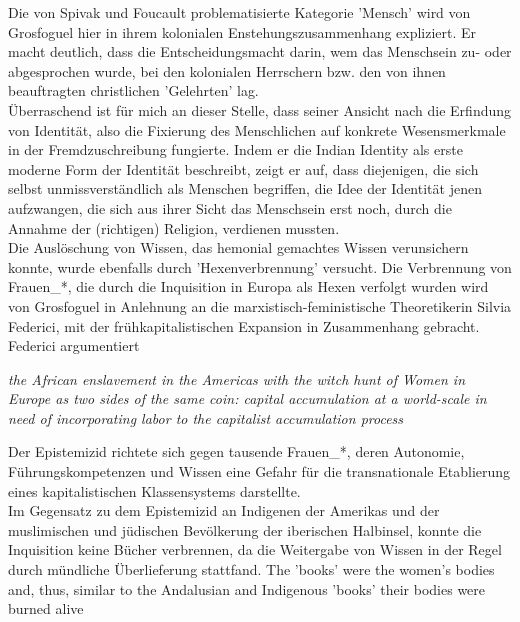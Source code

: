 \noindent Die von Spivak und Foucault
problematisierte Kategorie 'Mensch' wird von Grosfoguel hier in ihrem
kolonialen Enstehungszusammenhang expliziert. Er macht deutlich, dass die
Entscheidungsmacht darin, wem das Menschsein zu- oder abgesprochen wurde, bei
den kolonialen Herrschern bzw. den von ihnen beauftragten christlichen
'Gelehrten' lag. \\
Überraschend ist für mich an dieser Stelle, dass seiner
Ansicht nach die Erfindung von Identität, also die Fixierung des Menschlichen
auf konkrete Wesensmerkmale in der Fremdzuschreibung fungierte. Indem er die
\glqq Indian Identity \grqq als erste moderne Form der Identität beschreibt, zeigt er
auf, dass diejenigen, die sich selbst unmissverständlich als Menschen
begriffen, die Idee der Identität jenen aufzwangen, die sich aus ihrer Sicht
das Menschsein erst noch, durch die Annahme der (richtigen) Religion, verdienen
mussten.\\

\noindent Die Auslöschung von Wissen, das hemonial gemachtes Wissen verunsichern konnte,
wurde ebenfalls durch 'Hexenverbrennung'  versucht. Die Verbrennung von
Frauen\_*, die durch die Inquisition in Europa als Hexen verfolgt wurden wird
von Grosfoguel in Anlehnung an die marxistisch-feministische Theoretikerin
Silvia Federici, mit der frühkapitalistischen Expansion in Zusammenhang
gebracht. Federici argumentiert
\begin{myenv}
  \textit{\glqq the African enslavement in the Americas with the witch hunt of
    Women in Europe as two sides of the same coin: capital accumulation at a
    world-scale in need of incorporating labor to the capitalist accumulation
  process\grqq \footnotemark {} }
\end{myenv}
Der Epistemizid richtete sich gegen tausende Frauen\_*, deren \glqq Autonomie,
Führungskompetenzen und Wissen\grqq \footnotemark {} 
eine Gefahr für die transnationale Etablierung
eines kapitalistischen Klassensystems darstellte.\\
Im Gegensatz zu dem Epistemizid an Indigenen der Amerikas und der muslimischen
und jüdischen Bevölkerung der iberischen Halbinsel, konnte die Inquisition
keine Bücher verbrennen, da die Weitergabe von Wissen in der Regel durch
mündliche Überlieferung stattfand. \glqq The 'books' were the women’s bodies and,
thus, similar to the Andalusian and Indigenous 'books' their bodies were burned
alive\grqq \footnotemark {}\\

